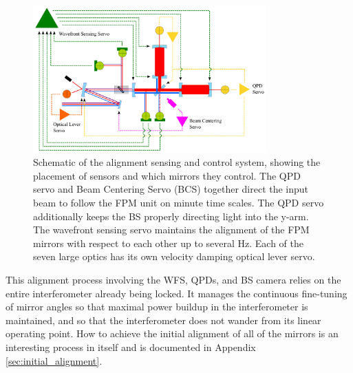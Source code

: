 \begin{figure} \begin{centering} \includegraphics[width=0.8\textwidth]{figures/ASClayout_wctrl.pdf} 
\caption[Schematic of the alignment sensing and control system]{Schematic of the alignment sensing and control system, showing the placement of sensors and which mirrors they control. The QPD servo and Beam Centering Servo (BCS) together direct the input beam to follow the FPM unit on minute time scales. The QPD servo additionally keeps the BS properly directing light into the y-arm. The wavefront sensing servo maintains the alignment of the FPM mirrors with respect to each other up to several Hz. Each of the seven large optics has its own velocity damping optical lever servo.}
\label{fig:ASClayout}
\end{centering}
\end{figure}

This alignment process involving the WFS, QPDs, and BS camera relies on the entire interferometer already being locked. It manages the continuous fine-tuning of mirror angles so that maximal power buildup in the interferometer is maintained, and so that the interferometer does not wander from its linear operating point. How to achieve the initial alignment of all of the mirrors is an interesting process in itself and is documented in Appendix \ref{sec:initial_alignment}.


